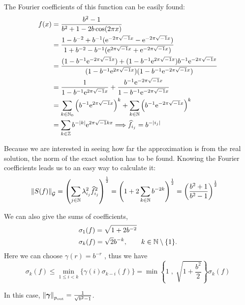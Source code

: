 \documentclass[final]{elsarticle}
\newcommand{\pout}{p_{\text{\rm{out}}}}
\newcommand{\bgamma}{\boldsymbol\gamma}
\theoremstyle{definition}
\theoremstyle{remark}
\begin{document}
\begin{itemize}
The Fourier coefficients of this function can be easily found:
\begin{align*}
f(x)&=\frac{b^2-1}{b^2+1-2b\cos(2\pi x)}\\
&=\frac{1-b^{-2}+b^{-1}(\me^{-2\pi\sqrt{-1}x}-\me^{-2\pi\sqrt{-1}x})}{1+b^{-2}-b^{-1}(\me^{2\pi\sqrt{-1}x}+\me^{-2\pi\sqrt{-1}x})}\\
&=\frac{(1-b^{-1}\me^{-2\pi\sqrt{-1}x})+(1-b^{-1}\me^{2\pi\sqrt{-1}x})b^{-1}\me^{-2\pi\sqrt{-1}x}}{(1-b^{-1}\me^{2\pi\sqrt{-1}x})(1-b^{-1}\me^{-2\pi\sqrt{-1}x})}\\
&=\frac{1}{1-b^{-1}\me^{2\pi\sqrt{-1}x}}+\frac{b^{-1}\me^{-2\pi\sqrt{-1}x}}{1-b^{-1}\me^{-2\pi\sqrt{-1}x}}\\
&=\sum_{k\in\naturals_0}\left(b^{-1}\me^{2\pi\sqrt{-1}x}\right)^k+\sum_{k\in\naturals}\left(b^{-1}\me^{-2\pi\sqrt{-1}x}\right)^k\\
&=\sum_{k\in\integers}b^{-\abs{k}}\me^{2\pi\sqrt{-1}kx}\Longrightarrow\hf_{i_j}=b^{-\abs{i_j}}
\end{align*}

Because we are interested in seeing how far the approximation is from the real solution, the norm of the exact solution has to be found. Knowing the Fourier coefficients leads us to an easy way to calculate it:
\begin{align*}
\norm[\cg]{S(f)}&=\left(\sum_{j\in\naturals}\lambda_{i_j}^2\hf_{i_j}^2\right)^{\frac{1}{2}} =\left(1+2\sum_{k\in\naturals}b^{-2k}\right)^{\frac{1}{2}}=\left(\frac{b^2+1}{b^2-1}\right)^{\frac{1}{2}}
\end{align*}

We can also give the sums of coefficients,
\begin{align*}
&\sigma_1(f)=\sqrt{1+2b^{-2}}\\
&\sigma_k(f)=\sqrt{2}b^{-k}, \qquad k \in\naturals\setminus\{1\}.
\end{align*}
Here we can choose  $\gamma(r)=b^{-r}$ , thus we have 
\begin{equation*}
\sigma_k(f) \le \min_{1 \le i <k}\{\gamma(i)\sigma_{k-i}(f)\}=\min\left\{1 \; , \; \sqrt{1+\frac{b^2}{2}} \right\}\sigma_k(f)
\end{equation*}

In this case, $\norm[\pout]{\bgamma}=\frac{1}{\sqrt{b^2-1}}$. 



\end{itemize}
\end{document}
